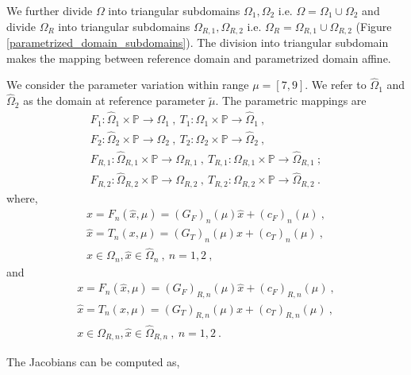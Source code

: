 \documentclass[a4paper,oneside,openright,spanish,english]{book}
\begin{document}
We further divide $\Omega$ into triangular subdomains $\Omega_1,\Omega_2$ i.e. $\Omega = \Omega_1 \cup \Omega_2$ and divide $\Omega_R$ into triangular subdomains $\Omega_{R,1},\Omega_{R,2}$ i.e. $\Omega_R = \Omega_{R,1} \cup \Omega_{R,2}$ (Figure \ref{parametrized_domain_subdomains}). The division into triangular subdomain makes the mapping between reference domain and parametrized domain affine.

We consider the parameter variation within range $\mu = [7,9]$. We refer to $\hat{\Omega}_1$ and $\hat{\Omega}_2$ as the domain at reference parameter $\tilde{\mu}$. The parametric mappings are
\begin{equation}
\begin{split}
F_1 : \hat{\Omega}_1 \times \mathbb{P} \rightarrow \Omega_1 \ , \
T_1 : \Omega_1 \times \mathbb{P} \rightarrow \hat{\Omega}_1 \ , \\
F_2 : \hat{\Omega}_2 \times \mathbb{P} \rightarrow \Omega_2 \ , \
T_2 : \Omega_2 \times \mathbb{P} \rightarrow \hat{\Omega}_2 \ , \\
F_{R,1} : \hat{\Omega}_{R,1} \times \mathbb{P} \rightarrow \Omega_{R,1} \ , \
T_{R,1} : \Omega_{R,1} \times \mathbb{P} \rightarrow \hat{\Omega}_{R,1} \ ; \\
F_{R,2} : \hat{\Omega}_{R,2} \times \mathbb{P} \rightarrow \Omega_{R,2} \ , \
T_{R,2} : \Omega_{R,2} \times \mathbb{P} \rightarrow \hat{\Omega}_{R,2} \ .
\end{split}
\end{equation}
where, 
\begin{equation}
\begin{split}
x = F_n(\hat{x},\mu) = (G_F)_n(\mu) \hat{x} + (c_F)_n(\mu) \ , \\
\hat{x} = T_n(x,\mu) = (G_T)_n(\mu) x + (c_T)_n(\mu) \ ,\\
x \in \Omega_n, \hat{x} \in \hat{\Omega}_n \ , \ n = 1,2 \ ,
\end{split}
\end{equation}
and
\begin{equation}
\begin{split}
x = F_n(\hat{x},\mu) = (G_F)_{R,n}(\mu) \hat{x} + (c_F)_{R,n}(\mu) \ , \\
\hat{x} = T_n(x,\mu) = (G_T)_{R,n}(\mu) x + (c_T)_{R,n}(\mu) \ , \\
x \in \Omega_{R,n}, \hat{x} \in \hat{\Omega}_{R,n} \ , \ n = 1,2 \ .
\end{split}
\end{equation}

The Jacobians can be computed as,
\end{document}
